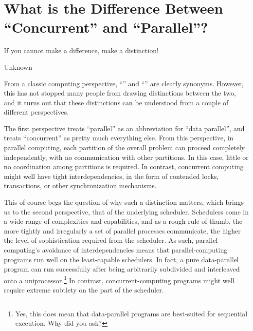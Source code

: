
\section{What is the Difference Between ``Concurrent'' and ``Parallel''?}
\label{sec:app:questions:What is the Difference Between ``Concurrent'' and ``Parallel''?}
%
\epigraph{If you cannot make a difference, make a distinction!}
	 {Unknown}

From a classic computing perspective, ``'' and ``''
are clearly synonyms.
However, this has not stopped many people from drawing distinctions
between the two, and it turns out that these distinctions can be
understood from a couple of different perspectives.

The first perspective treats ``parallel'' as an abbreviation for
``data parallel'', and treats ``concurrent'' as pretty much everything
else.
From this perspective, in parallel computing, each partition of the
overall problem can proceed completely independently, with no
communication with other partitions.
In this case, little or no coordination among partitions is required.
In contrast, concurrent computing might well have tight interdependencies,
in the form of contended locks, transactions, or other synchronization
mechanisms.

\QuickQuizEnd

This of course begs the question of why such a distinction matters,
which brings us to the second perspective, that of the underlying scheduler.
Schedulers come in a wide range of complexities and capabilities, and
as a rough rule of thumb, the more tightly and irregularly a set of
parallel processes communicate, the higher the level of sophistication
required from the scheduler.
As such, parallel computing's avoidance of interdependencies means that
parallel-computing programs run well on the least-capable schedulers.
In fact, a pure data-parallel program can run successfully after
being arbitrarily subdivided and interleaved onto a uniprocessor.\footnote{
	Yes, this does mean that data-parallel programs are best-suited
	for sequential execution.
	Why did you ask?}
In contrast, concurrent-computing programs might well require extreme
subtlety on the part of the scheduler.

